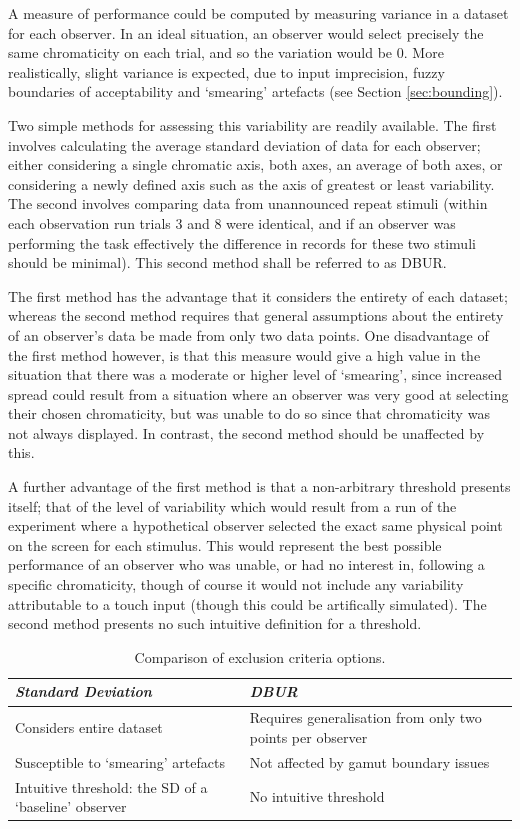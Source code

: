 A measure of performance could be computed by measuring variance in a dataset for each observer. In an ideal situation, an observer would select precisely the same chromaticity on each trial, and so the variation would be 0. More realistically, slight variance is expected, due to input imprecision, fuzzy boundaries of acceptability and `smearing' artefacts (see Section \ref{sec:bounding}).

Two simple methods for assessing this variability are readily available. The first involves calculating the average standard deviation of data for each observer; either considering a single chromatic axis, both axes, an average of both axes, or considering a newly defined axis such as the axis of greatest or least variability. The second involves comparing data from unannounced repeat stimuli (within each observation run trials 3 and 8 were identical, and if an observer was performing the task effectively the difference in records for these two stimuli should be minimal). This second method shall be referred to as \acrfull{DBUR}.

The first method has the advantage that it considers the entirety of each dataset; whereas the second method requires that general assumptions about the entirety of an observer's data be made from only two data points. One disadvantage of the first method however, is that this measure would give a high value in the situation that there was a moderate or higher level of `smearing', since increased spread could result from a situation where an observer was very good at selecting their chosen chromaticity, but was unable to do so since that chromaticity was not always displayed. In contrast, the second method should be unaffected by this.

A further advantage of the first method is that a non-arbitrary threshold presents itself; that of the level of variability which would result from a run of the experiment where a hypothetical observer selected the exact same physical point on the screen for each stimulus. This would represent the best possible performance of an observer who was unable, or had no interest in, following a specific chromaticity, though of course it would not include any variability attributable to a touch input (though this could be artifically simulated). The second method presents no such intuitive definition for a threshold.

\begin{table}[hbtp]
\begin{tabular}{|p{}|p{}|}
\hline
\emph{Standard Deviation} & \emph{\acrshort{DBUR}} \\
\hline
Considers entire dataset & Requires generalisation from only two points per observer \\
\hline
Susceptible to `smearing' artefacts & Not affected by gamut boundary issues \\
\hline
Intuitive threshold: the SD of a `baseline' observer & No intuitive threshold \\
\hline
\end{tabular}
\caption{Comparison of exclusion criteria options.}
\label{tab:exclusion}
\end{table}

